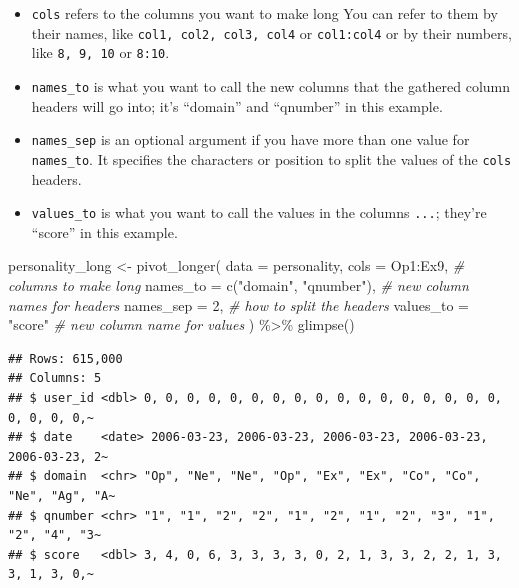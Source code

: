 \documentclass[
  oneside]{book}
\newenvironment{Shaded}{\begin{snugshade}}{\end{snugshade}}
\newcommand{\AttributeTok}[1]{\textcolor[rgb]{0.77,0.63,0.00}{#1}}
\newcommand{\CommentTok}[1]{\textcolor[rgb]{0.56,0.35,0.01}{\textit{#1}}}
\newcommand{\DecValTok}[1]{\textcolor[rgb]{0.00,0.00,0.81}{#1}}
\newcommand{\FunctionTok}[1]{\textcolor[rgb]{0.00,0.00,0.00}{#1}}
\newcommand{\NormalTok}[1]{#1}
\newcommand{\OtherTok}[1]{\textcolor[rgb]{0.56,0.35,0.01}{#1}}
\newcommand{\SpecialCharTok}[1]{\textcolor[rgb]{0.00,0.00,0.00}{#1}}
\newcommand{\StringTok}[1]{\textcolor[rgb]{0.31,0.60,0.02}{#1}}
\providecommand{\tightlist}{%
  \setlength{\itemsep}{0pt}\setlength{\parskip}{0pt}}
\begin{document}
\begin{itemize}
\tightlist
\item
  \texttt{cols} refers to the columns you want to make long You can refer to them by their names, like \texttt{col1,\ col2,\ col3,\ col4} or \texttt{col1:col4} or by their numbers, like \texttt{8,\ 9,\ 10} or \texttt{8:10}.
\item
  \texttt{names\_to} is what you want to call the new columns that the gathered column headers will go into; it's ``domain'' and ``qnumber'' in this example.
\item
  \texttt{names\_sep} is an optional argument if you have more than one value for \texttt{names\_to}. It specifies the characters or position to split the values of the \texttt{cols} headers.
\item
  \texttt{values\_to} is what you want to call the values in the columns \texttt{...}; they're ``score'' in this example.
\end{itemize}

\begin{Shaded}
\begin{Highlighting}[]
\NormalTok{personality\_long }\OtherTok{\textless{}{-}} \FunctionTok{pivot\_longer}\NormalTok{(}
  \AttributeTok{data =}\NormalTok{ personality, }
  \AttributeTok{cols =}\NormalTok{ Op1}\SpecialCharTok{:}\NormalTok{Ex9,                    }\CommentTok{\# columns to make long }
  \AttributeTok{names\_to =} \FunctionTok{c}\NormalTok{(}\StringTok{"domain"}\NormalTok{, }\StringTok{"qnumber"}\NormalTok{), }\CommentTok{\# new column names for headers}
  \AttributeTok{names\_sep =} \DecValTok{2}\NormalTok{,                     }\CommentTok{\# how to split the headers}
  \AttributeTok{values\_to =} \StringTok{"score"}                \CommentTok{\# new column name for values}
\NormalTok{) }\SpecialCharTok{\%\textgreater{}\%}
  \FunctionTok{glimpse}\NormalTok{()}
\end{Highlighting}
\end{Shaded}

\begin{verbatim}
## Rows: 615,000
## Columns: 5
## $ user_id <dbl> 0, 0, 0, 0, 0, 0, 0, 0, 0, 0, 0, 0, 0, 0, 0, 0, 0, 0, 0, 0, 0,~
## $ date    <date> 2006-03-23, 2006-03-23, 2006-03-23, 2006-03-23, 2006-03-23, 2~
## $ domain  <chr> "Op", "Ne", "Ne", "Op", "Ex", "Ex", "Co", "Co", "Ne", "Ag", "A~
## $ qnumber <chr> "1", "1", "2", "2", "1", "2", "1", "2", "3", "1", "2", "4", "3~
## $ score   <dbl> 3, 4, 0, 6, 3, 3, 3, 3, 0, 2, 1, 3, 3, 2, 2, 1, 3, 3, 1, 3, 0,~
\end{verbatim}
\end{document}
